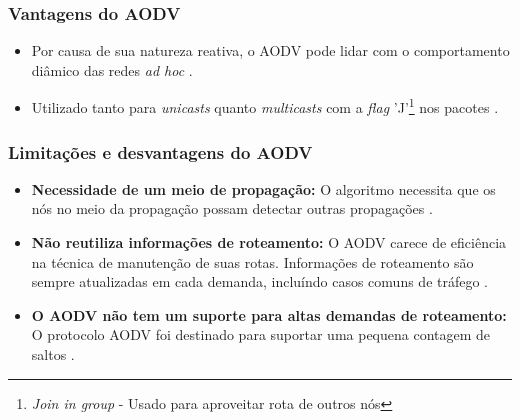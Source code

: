 \subsubsection{Vantagens do AODV}
\begin{itemize}
	\item Por causa de sua natureza reativa, o AODV pode lidar com o comportamento di\^amico das redes \textit{ad hoc} \cite{schwingenschlogl}.
	\item Utilizado tanto para \textit{unicasts} quanto \textit{multicasts} com a \textit{flag} 'J'\footnote{\textit{Join in group} - Usado para aproveitar rota de outros n\'os} nos pacotes \cite{ramachandranTech}.
\end{itemize}

\subsubsection{Limita\c{c}\~oes e desvantagens do AODV}
\begin{itemize}
	\item \textbf{Necessidade de um meio de propaga\c{c}\~ ao:} O algoritmo necessita que os n\'os no meio da propaga\c{c}\~ ao possam detectar outras propaga\c{c}\~oes \cite{gorantala}.
	\item \textbf{N\~ao reutiliza informa\c{c}\~oes de roteamento:} O AODV carece de efici\^encia na t\'ecnica de manuten\c{c}\~ao de suas rotas. Informa\c{c}\~oes de roteamento s\~ao sempre atualizadas em cada demanda, inclu\'indo casos comuns de tr\'afego \cite{ramachandran}.
	\item \textbf{O AODV n\~ao tem um suporte para altas demandas de roteamento:} O protocolo AODV foi destinado para suportar uma pequena contagem de saltos \cite{ramachandran}.
\end{itemize}
